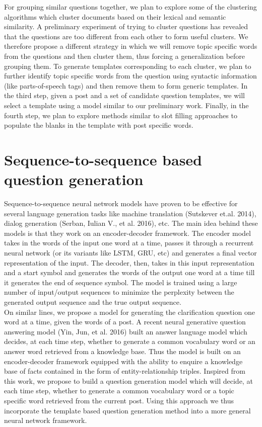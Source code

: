 \documentclass[11pt]{report}
\numberwithin{equation}{section}
\begin{document}
For grouping similar questions together, we plan to explore some of the clustering algorithms which cluster documents based on their lexical and semantic similarity. A preliminary experiment of trying to cluster questions has revealed that the questions are too different from each other to form useful clusters. We therefore propose a different strategy in which we will remove topic specific words from the questions and then cluster them, thus forcing a generalization before grouping them. To generate templates corresponding to each cluster, we plan to further identify topic specific words from the question using syntactic information (like parts-of-speech tags) and then remove them to form generic templates. In the third step, given a post and a set of candidate question templates, we will select a template using a model similar to our preliminary work. Finally, in the fourth step, we plan to explore methods similar to slot filling approaches \cite{} to populate the blanks in the template with post specific words.

\newpage
\section{Sequence-to-sequence based question generation}

Sequence-to-sequence neural network models have proven to be effective for several language generation tasks like machine translation (Sutskever et.al. 2014), dialog generation (Serban, Iulian V., et al. 2016), etc. The main idea behind these models is that they work on an encoder-decoder framework. The encoder model takes in the words of the input one word at a time, passes it through a recurrent neural network (or its variants like LSTM, GRU, etc) and generates a final vector representation of the input. The decoder, then, takes in this input representation and a start symbol and generates the words of the output one word at a time till it generates the end of sequence symbol. The model is trained using a large number of input/output sequences to minimize the perplexity between the generated output sequence and the true output sequence.\\

\noindent
On similar lines, we propose a model for generating the clarification question one word at a time, given the words of a post. A recent neural generative question answering model (Yin, Jun, et al.  2016) built an answer language model which decides, at each time step, whether to generate a common vocabulary word or an answer word retrieved from a knowledge base. Thus the model is built on an encoder-decoder framework equipped with the ability to enquire a knowledge base of facts contained in the form of entity-relationship triples. Inspired from this work, we propose to build a question generation model which will decide, at each time step, whether to generate a common vocabulary word or a topic specific word retrieved from the current post. Using this approach we thus incorporate the template based question generation method into a more general neural network framework.
\end{document}
